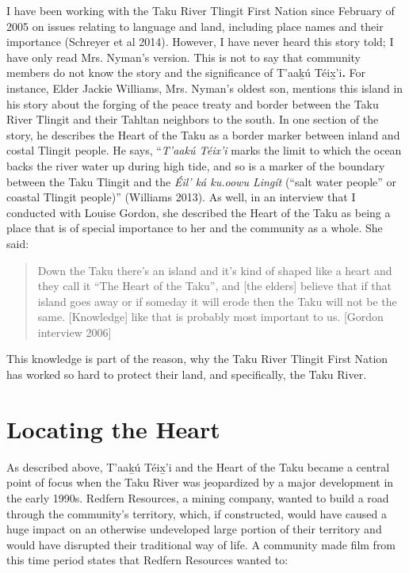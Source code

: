 I have been working with the Taku River Tlingit First Nation since February of 2005 on issues relating to language and land, including place names and their importance (Schreyer et al 2014). However, I have never heard this story told; I have only read Mrs. Nyman’s version. This is not to say that community members do not know the story and the significance of T'aak̲ú Téix̲'i\textbf{. }For instance, Elder Jackie Williams, Mrs. Nyman’s oldest son, mentions this island in his story about the forging of the peace treaty and border between the Taku River Tlingit and their Tahltan neighbors to the south. In one section of the story, he describes the Heart of the Taku as a border marker between inland and costal Tlingit people. He says, “\textit{T’aakú Téix’i} marks the limit to which the ocean backs the river water up during high tide, and so is a marker of the boundary between the Taku Tlingit and the \textit{Éil’ ká ku.oowu Lingít }(“salt water people” or coastal Tlingit people)” (Williams 2013). As well, in an interview that I conducted with Louise Gordon, she described the Heart of the Taku as being a place that is of special importance to her and the community as a whole. She said:

\begin{quote}
Down the Taku there’s an island and it’s kind of shaped like a heart and they call it “The Heart of the Taku”, and [the elders] believe that if that island goes away or if someday it will erode then the Taku will not be the same. [Knowledge] like that is probably most important to us. [Gordon interview 2006]
\end{quote}

This knowledge is part of the reason, why the Taku River Tlingit First Nation has worked so hard to protect their land, and specifically, the Taku River.

\section{Locating the Heart}

As described above, T'aak̲ú Téix̲'i and the Heart of the Taku became a central point of focus when the Taku River was jeopardized by a major development in the early 1990s. Redfern Resources, a mining company, wanted to build a road through the community’s territory, which, if constructed, would have caused a huge impact on an otherwise undeveloped large portion of their territory and would have disrupted their traditional way of life. A community made film from this time period states that Redfern Resources wanted to:

